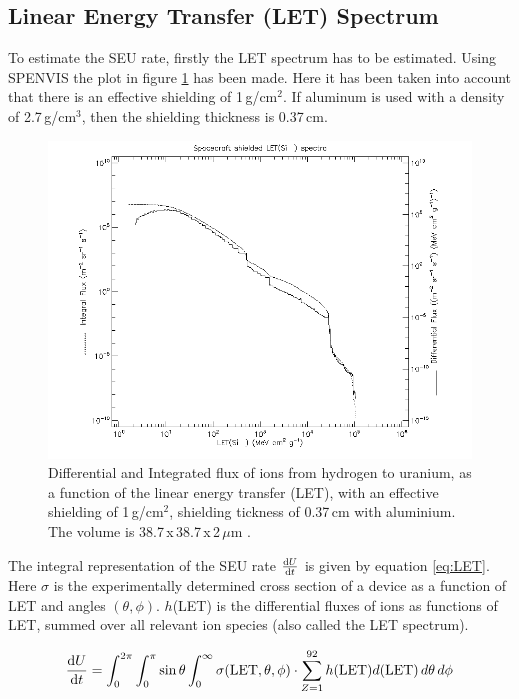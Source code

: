 \subsection{\label{subsec:let}Linear Energy Transfer (LET) Spectrum}
To estimate the SEU rate, firstly the LET spectrum has to be estimated. Using SPENVIS the plot in figure \ref{fig:LET-shielding} has been made. Here it has been taken into account that there is an effective shielding of 1\,g/cm$^2$. If aluminum is used with a density of 2.7\,g/cm$^3$, then the shielding thickness is 0.37\,cm. 

\begin{figure}[H]
\centering
\includegraphics[width=.9\textwidth]{figures/LET-shielding.png}
\caption{Differential and Integrated flux of ions from hydrogen to uranium, as a function of the linear energy transfer (LET), with an effective shielding of 1\,g/cm$^2$, shielding tickness of 0.37\,cm with aluminium. The volume is 38.7\,x\,38.7\,x\,2\,$\mu$m \cite{SPENVIS}.}
\label{fig:LET-shielding}
\end{figure}

The integral representation of the SEU rate $\dv{U}{t}$ is given by equation \ref{eq:LET}. Here $\sigma$ is the experimentally determined cross section of a device as a function of LET and angles $(\theta,\phi)$. $h$(LET) is the differential fluxes of ions as functions of LET, summed over all relevant ion species (also called the LET spectrum).

\begin{equation}
\dv{U}{t} = \int^{2 \pi}_0 \int^\pi_0 \sin{\theta} \int^{\infty}_0 \sigma(\text{LET}, \theta, \phi) \cdot \sum^{92}_{Z=1} h(\text{LET}) d(\text{LET}) \,d\theta\,d\phi \label{eq:LET}
\end{equation}

